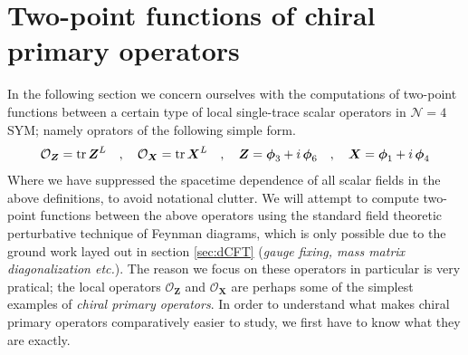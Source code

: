 %
\section{Two-point functions of chiral primary operators}\label{sec:CPO}
In the following section we concern ourselves with the computations of two-point functions between a certain type of local single-trace scalar operators in $\mathcal{N} = 4$ SYM; namely oprators of the following simple form.
%
%
\begin{equation}\label{chiral_primaries}
\mathcal{O}_{\boldsymbol{Z}} = \tr \boldsymbol{Z}^L
%
\quad , \quad
%
\mathcal{O}_{\boldsymbol{X}} = \tr \boldsymbol{X}^L
%
\quad , \quad
%
\boldsymbol{Z} = \boldsymbol{\phi}_3 + i \, \boldsymbol{\phi}_6
%
\quad , \quad
%
\boldsymbol{X} = \boldsymbol{\phi}_1 + i \, \boldsymbol{\phi}_4
\end{equation}
%
%
Where we have suppressed the spacetime dependence of all scalar fields in the above definitions, to avoid notational clutter. We will attempt to compute two-point functions between the above operators using the standard field theoretic perturbative technique of Feynman diagrams, which is only possible due to the ground work layed out in section \ref{sec:dCFT} (\textit{gauge fixing, mass matrix diagonalization etc.}). The reason we focus on these operators in particular is very pratical; the local operators $\mathcal{O}_{\boldsymbol{Z}}$ and $\mathcal{O}_{\boldsymbol{X}}$ are perhaps some of the simplest examples of \textit{chiral primary operators}. In order to understand what makes chiral primary operators comparatively easier to study, we first have to know what they are exactly.

